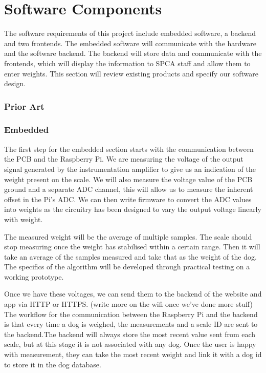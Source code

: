 
\chapter{Software Components}

The software requirements of this project include embedded software, a backend and two frontends. The embedded software will communicate with the hardware and the software backend. The backend will store data and communicate with the frontends, which will display the information to SPCA staff and allow them to enter weights. This section will review existing products and specify our software design. 

\subsection{Prior Art}

\subsection{Embedded}
The first step for the embedded section starts with the communication between the PCB and the Raspberry Pi. We are measuring the voltage of the output signal generated by the instrumentation amplifier to give us an indication of the weight present on the scale. We will also measure the voltage value of the PCB ground and a separate ADC channel, this will allow us to measure the inherent offset in the Pi’s ADC. We can then write firmware to convert the ADC values into weights as the circuitry has been designed to vary the output voltage linearly with weight. 

The measured weight will be the average of multiple samples. The scale should stop measuring once the weight has stabilised within a certain range. Then it will take an average of the samples measured and take that as the weight of the dog. The specifics of the algorithm will be developed through practical testing on a working prototype. 

Once we have these voltages, we can send them to the backend of the website and app via HTTP or HTTPS. (write more on the wifi once we’ve done more stuff)
The workflow for the communication between the Raspberry Pi and the backend is that every time a dog is weighed, the measurements and a scale ID are sent to the backend.The backend will always store the most recent value sent from each scale, but at this stage it is not associated with any dog. Once the user is happy with measurement, they can take the most recent weight and link it with a dog id to store it in the dog database.

